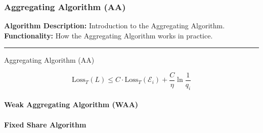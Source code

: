 \subsubsection{Aggregating Algorithm (AA)}
\textbf{Algorithm Description:} Introduction to the Aggregating Algorithm.\newline
\textbf{Functionality:} How the Aggregating Algorithm works in practice.\newline
\noindent\rule{\textwidth}{0.1pt}
\begin{algorithm}[H]
    \caption{Aggregating Algorithm (AA)}\label{alg:cap}
    \begin{algorithmic}[1]
      \end{algorithmic}
\end{algorithm}

\begin{equation}
    \text{Loss}_T(L) \leq C \cdot \text{Loss}_T(\mathcal{E}_i) + \frac{C}{\eta}\ln\frac{1}{q_i} 
\end{equation}

\paragraph{Weak Aggregating Algorithm (WAA)}

\paragraph{Fixed Share Algorithm}

